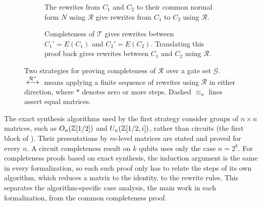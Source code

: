 \documentclass[acmsmall,screen,nonacm]{acmart}
\begin{document}

\begin{figure}[!thb]
\centering
\begin{subfigure}[b]{0.42\linewidth}
  \centering
  \caption{The rewrites from $C_1$ and $C_2$ to their common normal form $N$ using $\mathcal{R}$ give rewrites from $C_1$ to $C_2$ using $\mathcal{R}$.}
  \label{fig:normalform}
\end{subfigure}\hfill
\begin{subfigure}[b]{0.52\linewidth}
  \centering
  \caption{Completeness of $\mathcal{T}$ gives rewrites between $C_1'=E(C_1)$ and $C_2'=E(C_2)$. Translating this proof back gives rewrites between $C_1$ and $C_2$ using $\mathcal{R}$.}
  \label{fig:translation}
\end{subfigure}
\caption{Two strategies for proving completeness of $\mathcal{R}$ over a gate set $\mathcal{G}$. $\;\overset{\mathcal{R}^{*}}{\longleftrightarrow}\;$ means applying a finite sequence of rewrites using $\mathcal{R}$ in either direction, where $*$ denotes zero or more steps. Dashed $\equiv_u$ lines assert equal matrices.}
\label{fig:strategies}
\end{figure}


The exact synthesis algorithms used by the first strategy consider groups of $n\times n$ matrices, such as $O_n(\mathbb{Z}[1/2])$ and $U_n(\mathbb{Z}[1/2,i])$, rather than circuits (the first block of ). Their presentations by $m$-level matrices are stated and proved for every $n$. A circuit completeness result on $k$ qubits uses only the case $n=2^k$. 
For completeness proofs based on exact synthesis, the induction argument is the same in every formalization, so each such proof only has to relate the steps of its own algorithm, which reduces a matrix to the identity, to the rewrite rules. This separates the algorithm-specific case analysis, the main work in each formalization, from the common completeness proof. 
\end{document}
